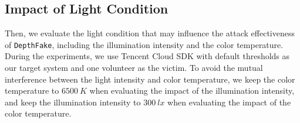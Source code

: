 
%


\subsection{Impact of Light Condition}


Then, we evaluate the light condition that may influence the attack effectiveness of \texttt{DepthFake}, including the illumination intensity and the color temperature. During the experiments, we use Tencent Cloud SDK with default thresholds as our target system and one volunteer as the victim.  
To avoid the mutual interference between the light intensity and color temperature, we keep the color temperature to $6500~K$ when evaluating the impact of the illumination intensity, and keep the illumination intensity to $300~lx$ when evaluating the impact of the color temperature.

